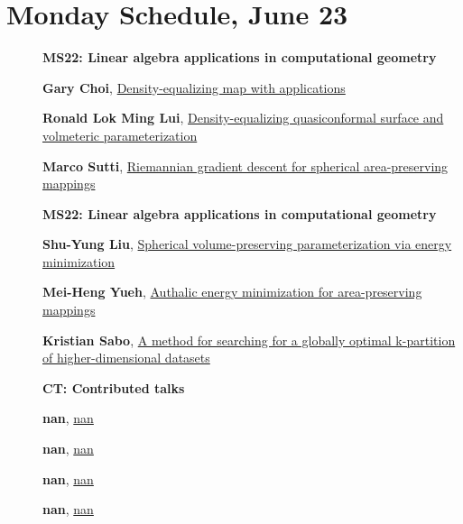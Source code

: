 \documentclass[ILAS2025-program.tex]{subfiles}
\begin{document}
\section*{Monday Schedule, June 23 }
        
        \begin{description}
    \item[] {\color{mstitle}\textbf{MS22: Linear algebra applications in computational geometry}} 
    \item[] \hypertarget{up0034}{}\textbf{Gary Choi}, \hyperlink{down0034}{Density-equalizing map with applications}
        \item[] \hypertarget{up0035}{}\textbf{Ronald Lok Ming Lui}, \hyperlink{down0035}{Density-equalizing quasiconformal surface and volmeteric parameterization}
        \item[] \hypertarget{up0036}{}\textbf{Marco Sutti}, \hyperlink{down0036}{Riemannian gradient descent for spherical area-preserving mappings
}
        \end{description}
    \begin{description}
    \item[] {\color{mstitle}\textbf{MS22: Linear algebra applications in computational geometry}} 
    \item[] \hypertarget{up0067}{}\textbf{Shu-Yung Liu}, \hyperlink{down0067}{Spherical volume-preserving parameterization via energy minimization}
        \item[] \hypertarget{up0068}{}\textbf{Mei-Heng Yueh}, \hyperlink{down0068}{Authalic energy minimization for area-preserving mappings}
        \item[] \hypertarget{up0069}{}\textbf{Kristian Sabo}, \hyperlink{down0069}{A method for searching for a globally optimal k-partition of higher-dimensional datasets}
        \end{description}
    \begin{description}
    \item[] {\color{mstitle}\textbf{CT: Contributed talks}} 
    \item[] \hypertarget{up0108}{}\textbf{nan}, \hyperlink{down0108}{nan}
        \item[] \hypertarget{up0109}{}\textbf{nan}, \hyperlink{down0109}{nan}
        \item[] \hypertarget{up0110}{}\textbf{nan}, \hyperlink{down0110}{nan}
        \item[] \hypertarget{up0111}{}\textbf{nan}, \hyperlink{down0111}{nan}
        \end{description}
    \newpage
\end{document}
